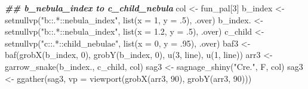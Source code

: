 \documentclass[
]{article}
\newenvironment{Shaded}{\begin{snugshade}}{\end{snugshade}}
\newcommand{\AttributeTok}[1]{\textcolor[rgb]{0.77,0.63,0.00}{#1}}
\newcommand{\DecValTok}[1]{\textcolor[rgb]{0.00,0.00,0.81}{#1}}
\newcommand{\DocumentationTok}[1]{\textcolor[rgb]{0.56,0.35,0.01}{\textbf{\textit{#1}}}}
\newcommand{\FloatTok}[1]{\textcolor[rgb]{0.00,0.00,0.81}{#1}}
\newcommand{\FunctionTok}[1]{\textcolor[rgb]{0.00,0.00,0.00}{#1}}
\newcommand{\NormalTok}[1]{#1}
\newcommand{\OtherTok}[1]{\textcolor[rgb]{0.56,0.35,0.01}{#1}}
\newcommand{\StringTok}[1]{\textcolor[rgb]{0.31,0.60,0.02}{#1}}
\begin{document}
\begin{Shaded}
\begin{Highlighting}[]
\DocumentationTok{\#\# b\_nebula\_index to c\_child\_nebula}
\NormalTok{col }\OtherTok{\textless{}{-}}\NormalTok{ fun\_pal[}\DecValTok{3}\NormalTok{]}
\NormalTok{b\_index }\OtherTok{\textless{}{-}} \FunctionTok{setnullvp}\NormalTok{(}\StringTok{"b::.*::nebula\_index"}\NormalTok{, }\FunctionTok{list}\NormalTok{(}\AttributeTok{x =} \DecValTok{1}\NormalTok{, }\AttributeTok{y =}\NormalTok{ .}\DecValTok{5}\NormalTok{), .over)}
\NormalTok{b\_index. }\OtherTok{\textless{}{-}} \FunctionTok{setnullvp}\NormalTok{(}\StringTok{"b::.*::nebula\_index"}\NormalTok{, }\FunctionTok{list}\NormalTok{(}\AttributeTok{x =} \FloatTok{1.2}\NormalTok{, }\AttributeTok{y =}\NormalTok{ .}\DecValTok{5}\NormalTok{), .over)}
\NormalTok{c\_child }\OtherTok{\textless{}{-}} \FunctionTok{setnullvp}\NormalTok{(}\StringTok{"c::.*::child\_nebulae"}\NormalTok{, }\FunctionTok{list}\NormalTok{(}\AttributeTok{x =} \DecValTok{0}\NormalTok{, }\AttributeTok{y =}\NormalTok{ .}\DecValTok{95}\NormalTok{), .over)}
\NormalTok{baf3 }\OtherTok{\textless{}{-}} \FunctionTok{baf}\NormalTok{(}\FunctionTok{grobX}\NormalTok{(b\_index, }\DecValTok{0}\NormalTok{), }\FunctionTok{grobY}\NormalTok{(b\_index, }\DecValTok{0}\NormalTok{), }\FunctionTok{u}\NormalTok{(}\DecValTok{3}\NormalTok{, line), }\FunctionTok{u}\NormalTok{(}\DecValTok{1}\NormalTok{, line))}
\NormalTok{arr3 }\OtherTok{\textless{}{-}} \FunctionTok{garrow\_snake}\NormalTok{(b\_index., c\_child, col)}
\NormalTok{sag3 }\OtherTok{\textless{}{-}} \FunctionTok{sagnage\_shiny}\NormalTok{(}\StringTok{"Cre."}\NormalTok{, F, col)}
\NormalTok{sag3 }\OtherTok{\textless{}{-}} \FunctionTok{ggather}\NormalTok{(sag3, }\AttributeTok{vp =} \FunctionTok{viewport}\NormalTok{(}\FunctionTok{grobX}\NormalTok{(arr3, }\DecValTok{90}\NormalTok{), }\FunctionTok{grobY}\NormalTok{(arr3, }\DecValTok{90}\NormalTok{)))}


\end{Highlighting}
\end{Shaded}
\end{document}
